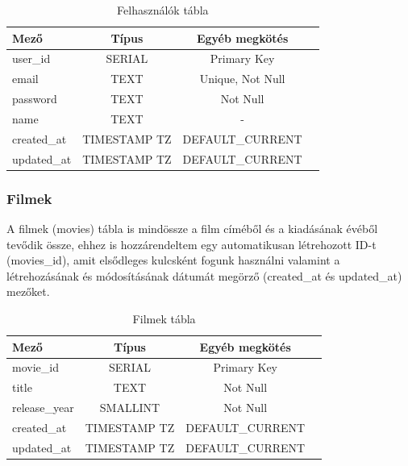 \documentclass[
]{thesis-ekf}
\theoremstyle{definition}
\theoremstyle{remark}
\begin{document}
\begin{table}[!h]
	\centering
	\begin{tabular}{|l|c|c|c|} 
		\hline
		\textbf{Mező} & \textbf{Típus} & \textbf{Egyéb megkötés} \\ 
		\hline
		user\_id & SERIAL &  Primary Key \\ 
		\hline
		email & TEXT & Unique, Not Null\\ 
		\hline
		password & TEXT & Not Null \\ 
		\hline
		name & TEXT & -\\ 
		\hline
		created\_at & TIMESTAMP TZ\footnotemark\label{fn:table-tz-megfeleloje} & DEFAULT\_CURRENT \\ 
		\hline
		updated\_at & TIMESTAMP TZ\footnotemark[\value{footnote}] & DEFAULT\_CURRENT \\ 
		\hline
	\end{tabular}
	\caption{Felhasználók tábla}
	\label{tbl-users-table}
\end{table}

\newpage

\subsubsection{Filmek}
A filmek (movies) tábla is mindössze a film címéből és a kiadásának évéből tevődik össze, ehhez is hozzárendeltem egy automatikusan létrehozott ID-t (movies\_id), amit elsődleges kulcsként fogunk használni valamint a létrehozásának és módosításának dátumát megörző (created\_at és updated\_at) mezőket.

\begin{table}[!h]
	\centering
	\begin{tabular}{|l|c|c|c|} 
		\hline
		\textbf{Mező} & \textbf{Típus} & \textbf{Egyéb megkötés} \\ 
		\hline
		movie\_id & SERIAL &  Primary Key \\ 
		\hline
		title & TEXT &  Not Null\\ 
		\hline
		release\_year & SMALLINT &  Not Null \\ 
		\hline
		created\_at & TIMESTAMP TZ\footnotemark[\value{footnote}] & DEFAULT\_CURRENT \\ 
		\hline
		updated\_at & TIMESTAMP TZ\footnotemark[\value{footnote}] & DEFAULT\_CURRENT \\ 
		\hline
	\end{tabular}
	\caption{Filmek tábla}
	\label{tbl-movies-table}
\end{table}
\end{document}
